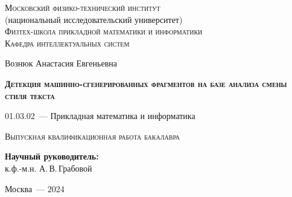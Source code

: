 \thispagestyle{empty}

\begin{titlepage}
    \begin{center}
        \textsc{Московский физико-технический институт}\\
        (национальный исследовательский университет)\\
        \textsc{Физтех-школа прикладной математики и информатики}\\
        \textsc{Кафедра интеллектуальных систем}
        \end{center}
        \vspace{2.5cm}
        \begin{center}
        {Вознюк Анастасия Евгеньевна}
        \par
        \vspace{2cm}
        {\Large \textsc{\textbf{Детекция машинно-сгенерированных фрагментов на базе анализа смены стиля текста}}}
        \par
        \vspace{2cm}
        {01.03.02~--- Прикладная математика и информатика}
        \par
        \vspace{2cm}
        \textsc{Выпускная квалификационная работа бакалавра}
        \end{center}
        \vspace{2cm}
        \hfill\parbox{8,4cm}{\textbf{Научный руководитель:}
        \\к.ф.-м.н. А.\,В.\,Грабовой}
        \par
        \vspace{2.5cm}
        \begin{center}
        {Москва~--- 2024}
    \end{center}
\end{titlepage}